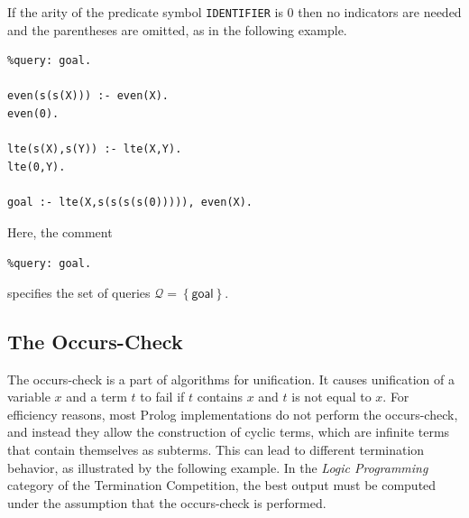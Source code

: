 If the arity of the predicate symbol \texttt{IDENTIFIER} is $0$
then no indicators are needed and the parentheses are omitted,
as in the following example.

\begin{example}\label{ex:lp-lte:competition}
  \phantom{x}
  \begin{verbatim}
%query: goal.

even(s(s(X))) :- even(X).
even(0).

lte(s(X),s(Y)) :- lte(X,Y).
lte(0,Y).

goal :- lte(X,s(s(s(s(0))))), even(X).
  \end{verbatim}
  Here, the comment
  \begin{center}
    \texttt{\%query: goal.}
  \end{center}
  specifies the set of queries $\mathcal{Q} = \left\{\mathsf{goal}\right\}$.
\end{example}


\subsection{The Occurs-Check}

The occurs-check is a part of algorithms for unification.
It causes unification of a variable $x$ and a term $t$
to fail if $t$ contains $x$ and $t$ is not equal to $x$.
For efficiency reasons, most
Prolog implementations do not perform the occurs-check, and 
instead they allow the construction of cyclic terms, which are
infinite terms that contain themselves as subterms. This can
lead to different termination behavior, as illustrated by the
following example.
In the \emph{Logic Programming} category of the
Termination Competition, the best output must be computed under
the assumption that the occurs-check is performed.

